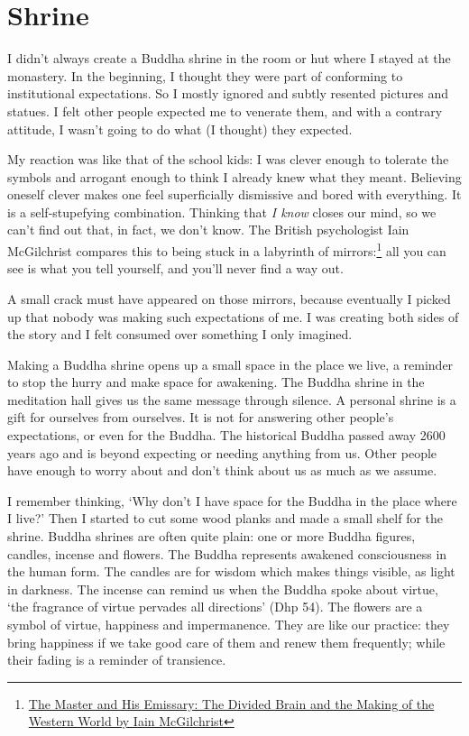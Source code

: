\section{Shrine}


\noindent I didn't always create a Buddha shrine in the room or hut
where I stayed at the monastery. In the beginning, I thought they were
part of conforming to institutional expectations. So I mostly ignored
and subtly resented pictures and statues. I felt other people expected
me to venerate them, and with a contrary attitude, I wasn't going to do
what (I thought) they expected.

My reaction was like that of the school kids: I was clever enough to
tolerate the symbols and arrogant enough to think I already knew what
they meant. Believing oneself clever makes one feel superficially
dismissive and bored with everything. It is a self-stupefying
combination. Thinking that \emph{I know} closes our mind, so we can't
find out that, in fact, we don't know. The British psychologist Iain
McGilchrist compares this to being stuck in a labyrinth of
mirrors:\footnote{\href{https://www.goodreads.com/book/show/6968772-the-master-and-his-emissary}{The
  Master and His Emissary: The Divided Brain and the Making of the
  Western World by Iain McGilchrist}} all you can see is what you tell
yourself, and you'll never find a way out.

A small crack must have appeared on those mirrors, because eventually I
picked up that nobody was making such expectations of me. I was creating
both sides of the story and I felt consumed over something I only
imagined.

Making a Buddha shrine opens up a small space in the place we live, a
reminder to stop the hurry and make space for awakening. The Buddha
shrine in the meditation hall gives us the same message through silence.
A personal shrine is a gift for ourselves from ourselves. It is not for
answering other people's expectations, or even for the Buddha. The
historical Buddha passed away 2600 years ago and is beyond expecting or
needing anything from us. Other people have enough to worry about and
don't think about us as much as we assume.

I remember thinking, `Why don't I have space for the Buddha in the place
where I live?' Then I started to cut some wood planks and made a small
shelf for the shrine. Buddha shrines are often quite plain: one or more
Buddha figures, candles, incense and flowers. The Buddha represents
awakened consciousness in the human form. The candles are for wisdom
which makes things visible, as light in darkness. The incense can remind
us when the Buddha spoke about virtue, `the fragrance of virtue pervades
all directions' (Dhp 54). The flowers are a symbol of virtue, happiness
and impermanence. They are like our practice: they bring happiness if we
take good care of them and renew them frequently; while their fading is
a reminder of transience.

